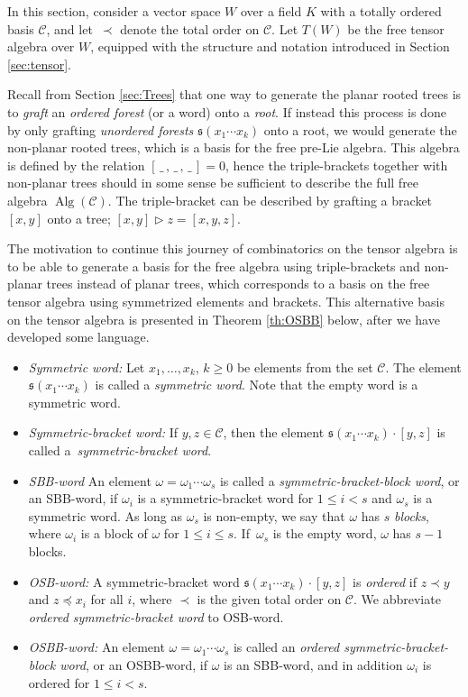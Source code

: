 \documentclass[10pt,a4paper]{amsart}
\newcommand*{\Alg}{\operatorname{Alg}}
\newcommand{\noarg}{\,\_\,}
\numberwithin{equation}{section}
\begin{document}
In this section, consider a vector space $W$ over a field $K$ with a totally ordered basis $\mathcal{C}$, and let~$\prec$ denote the total order on $\mathcal{C}$. Let $T(W)$ be the free tensor algebra over $W$, equipped with the structure and notation introduced in Section \ref{sec:tensor}.

Recall from Section \ref{sec:Trees} that one way to generate the planar rooted trees is to \emph{graft} an \emph{ordered forest} (or a word) onto a \emph{root}. If instead this process is done by only grafting \emph{unordered forests} $\mathfrak{s}(x_1 \cdots x_k)$ onto a root, we would generate the non-planar rooted trees, which is a basis for the free pre-Lie algebra. This algebra is defined by the relation $[\noarg, \noarg, \noarg]=0$, hence the triple-brackets together with non-planar trees should in some sense be sufficient to describe the full free algebra $\Alg(\mathcal{C})$. The triple-bracket can be described by grafting a bracket $[x,y]$ onto a tree; $[x,y]\rhd z = [x,y,z]$.

The motivation to continue this journey of combinatorics on the tensor algebra is to be able to generate a basis for the free algebra using triple-brackets and non-planar trees instead of planar trees, which corresponds to a basis on the free tensor algebra using symmetrized elements and brackets. This alternative basis on the tensor algebra is presented in Theorem \ref{th:OSBB} below, after we have developed some language.
\begin{itemize}\itemsep=0pt
 \item \textit{Symmetric word:} Let $x_1, \dots, x_k$, $k\geq 0$ be elements from the set $\mathcal{C}$. The element $\mathfrak{s}(x_1 \cdots x_k)$ is called a \emph{symmetric word}. Note that the empty word is a symmetric word.
 \item \textit{Symmetric-bracket word:} If $y,z \in \mathcal{C}$, then the element $\mathfrak{s}(x_1 \cdots x_k) \cdot [y,z]$ is called a~\emph{sym\-met\-ric-bracket word}.
 \item \textit{SBB-word} An element $\omega = \omega_1 \cdots \omega_s$ is called a \emph{symmetric-bracket-block word}, or an SBB-word, if $\omega_i$ is a symmetric-bracket word for $1\leq i <s$ and $\omega_s$ is a symmetric word. As long as $\omega_s$ is non-empty, we say that $\omega$ has $s$ \emph{blocks}, where $\omega_i$ is a block of $\omega$ for $1\leq i \leq s$. If~$\omega_s$ is the empty word, $\omega$ has $s-1$ blocks.
 \item \textit{OSB-word:} A symmetric-bracket word $\mathfrak{s}(x_1 \cdots x_k) \cdot [y,z]$ is \emph{ordered} if $z\prec y$ and $z \preceq x_i$ for all $i$, where $\prec$ is the given total order on $\mathcal{C}$. We abbreviate \emph{ordered symmetric-bracket word} to OSB-word.
 \item \textit{OSBB-word:} An element $\omega = \omega_1 \cdots \omega_s$ is called an \emph{ordered symmetric-bracket-block word}, or an OSBB-word, if $\omega$ is an SBB-word, and in addition $\omega_i$ is ordered for $1\leq i <s$.
\end{itemize}
\end{document}
